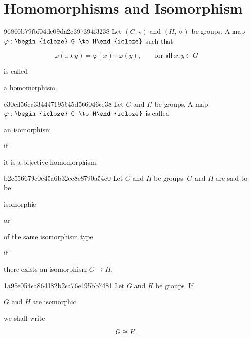 \section{Homomorphisms and Isomorphism}
\begin{note}{96860b79fbf04dc09da2c397394f3238}
    Let \({ (G, \star) }\) and \({ (H, \diamond) }\) be groups.
    A map \({ \varphi : \begin{icloze}{3}G \to H\end{icloze} }\) such that
    \begin{icloze}{1}
        \[
            \varphi(x \star y) = \varphi(x) \diamond \varphi(y), \qquad \text{for all}\ x, y \in G
        \]
    \end{icloze}
    is called \begin{icloze}{2}a homomorphism.\end{icloze}
\end{note}

\begin{note}{e30cd56ca334447195645d566046ce38}
    Let \({ G }\) and \({ H }\) be groups.
    A map \({ \varphi : \begin{icloze}{3}G \to H\end{icloze} }\) is called \begin{icloze}{2}an isomorphism\end{icloze} if \begin{icloze}{1}it is a bijective homomorphism.\end{icloze}
\end{note}

\begin{note}{b2c556679c0e45a6b32ec8e8790a54c0}
    Let \({ G }\) and \({ H }\) be groups.
    \({ G }\) and \({ H }\) are said to be \begin{icloze}{2}isomorphic\end{icloze} or \begin{icloze}{2}of the same isomorphism type\end{icloze} if \begin{icloze}{1}there exists an isomorphism \({ G \to H }\).\end{icloze}
\end{note}

\begin{note}{1a95e054ea864182b2ea76e195bb7481}
    Let \({ G }\) and \({ H }\) be groups.
    If \begin{icloze}{2}\({ G }\) and \({ H }\) are isomorphic\end{icloze} we shall write
    \begin{icloze}{1}
        \[
            G \cong H.
        \]
    \end{icloze}
\end{note}

